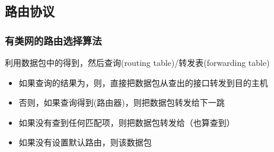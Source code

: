 

\subsection{路由协议}
\subsubsection{有类网的路由选择算法}
利用数据包中的得到，然后查询(routing table)/转发表(forwarding table)
\begin{itemize}
	\item 如果查询的结果为，则，直接把数据包从查出的接口转发到目的主机
	\item 否则，如果查询得到(路由器)，则把数据包转发给下一跳
	\item 如果没有查到任何匹配项，则把数据包转发给（也算查到）
	\item 如果没有设置默认路由，则该数据包
\end{itemize}

